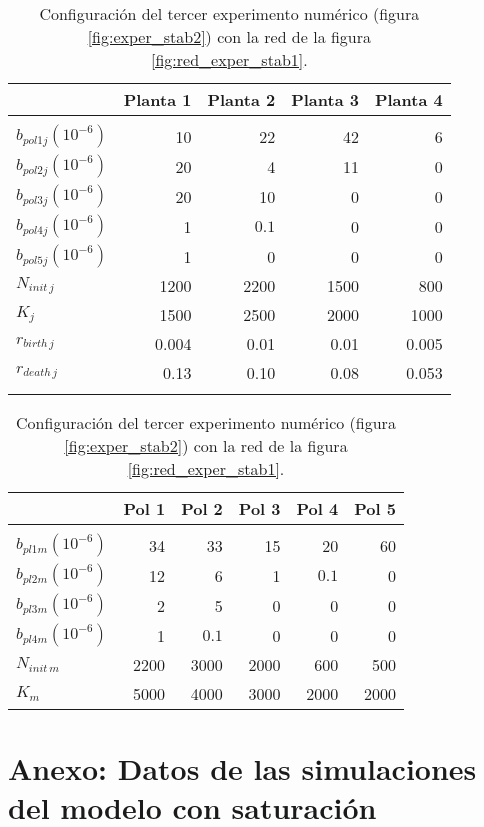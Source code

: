 \begin{table}[h!]
\centering
\normalsize
\caption{Configuración del tercer experimento numérico (figura \ref{fig:exper_stab2}) con la red de la figura \ref{fig:red_exper_stab1}.}
\footnotesize
\begin{tabular}{lrrrr}
\hline
 & Planta 1 & Planta 2 & Planta 3 & Planta 4  \\
\hline
\\
$b_{pol1j}\left(10^{-6}\right)$ & 10 & 22 & 42 & 6 \\
$b_{pol2j}\left(10^{-6}\right)$ & 20 & 4 & 11 & 0 \\
$b_{pol3j}\left(10^{-6}\right)$ & 20 & 10 & 0 & 0 \\
$b_{pol4j}\left(10^{-6}\right)$ & 1 & $0.1 $ & 0 & 0 \\
$b_{pol5j}\left(10^{-6}\right)$ & 1 & 0 & 0 & 0 \\
$N_{init\,j}$ & 1200 & 2200 & 1500 & 800 \\
$K_{j}$ & 1500 & 2500 & 2000 & 1000 \\
$r_{birth\, j}$ & 0.004 & 0.01 & 0.01 & 0.005 \\
$r_{death\, j}$ & 0.13 & 0.10 & 0.08 & 0.053 \\

\hline
\\
\end{tabular}

\begin{tabular}{lrrrrr}
\hline
 &Pol 1&Pol 2&Pol 3&Pol 4&Pol 5\\
\hline
\\
$b_{pl1m}\left(10^{-6}\right)$ & 34 & 33 & 15 & 20 & 60\\
$b_{pl2m}\left(10^{-6}\right)$ & 12 & 6 & 1 & $0.1$ & 0\\
$b_{pl3m}\left(10^{-6}\right)$ & 2 & 5 & 0 & 0 & 0\\
$b_{pl4m}\left(10^{-6}\right)$ & 1 & $0.1$ & 0 & 0 & 0\\
$N_{init\,m}$ & 2200 & 3000 & 2000 & 600 & 500 \\
$K_{m}$& 5000 & 4000 & 3000 & 2000 & 2000\\
\hline
\end{tabular}
\label{tab:experiment3}
\end{table}

\section{Anexo: Datos de las simulaciones del modelo con saturación}
\label{DINAMICA_ANEXO_saturacion}

